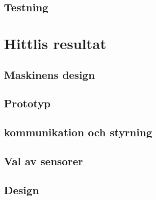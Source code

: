 \documentclass[11pt,a4paper,oneside]{book}
\begin{document}
\section{Testning}

\chapter{Hittlis resultat}
\section{Maskinens design}

%
\section{Prototyp}
\section{kommunikation och styrning}

\section{Val av sensorer}
\section{Design}


\end{document}
